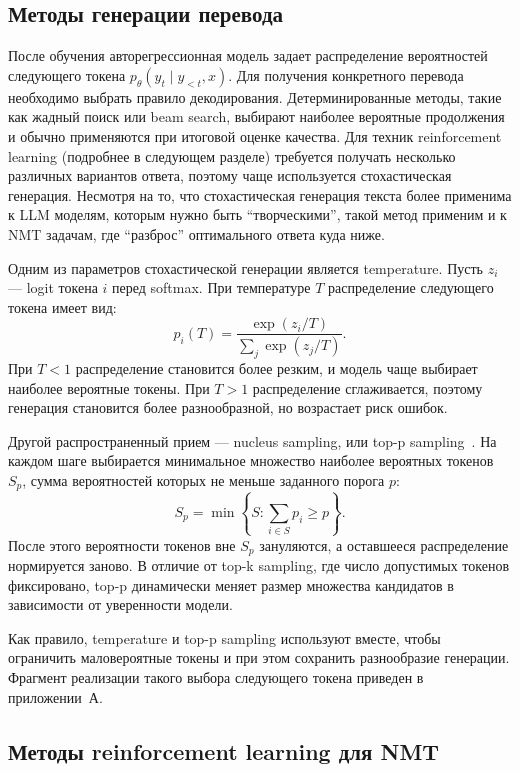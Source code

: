 \subsection{Методы генерации перевода}

После обучения авторегрессионная модель задает распределение вероятностей следующего токена $p_\theta(y_t \mid y_{<t}, x)$. Для получения конкретного перевода необходимо выбрать правило декодирования. Детерминированные методы, такие как жадный поиск или beam search, выбирают наиболее вероятные продолжения и обычно применяются при итоговой оценке качества.
Для техник reinforcement learning (подробнее в следующем разделе) требуется получать несколько различных вариантов ответа, поэтому чаще используется стохастическая генерация.
Несмотря на то, что стохастическая генерация текста более применима к LLM моделям, которым нужно быть ``творческими'', такой метод применим и к NMT задачам, где ``разброс'' оптимального ответа куда ниже.

Одним из параметров стохастической генерации является temperature. Пусть $z_i$ --- logit токена $i$ перед softmax. При температуре $T$ распределение следующего токена имеет вид:
\[
	p_i(T) = \frac{\exp(z_i / T)}{\sum_j \exp(z_j / T)}.
\]
При $T < 1$ распределение становится более резким, и модель чаще выбирает наиболее вероятные токены. При $T > 1$ распределение сглаживается, поэтому генерация становится более разнообразной, но возрастает риск ошибок.

Другой распространенный прием --- nucleus sampling, или top-p sampling~\cite{nucleus_sampling}. На каждом шаге выбирается минимальное множество наиболее вероятных токенов $S_p$, сумма вероятностей которых не меньше заданного порога $p$:
\[
	S_p = \min \left\{ S: \sum_{i \in S} p_i \geq p \right\}.
\]
После этого вероятности токенов вне $S_p$ зануляются, а оставшееся распределение нормируется заново. В отличие от top-k sampling, где число допустимых токенов фиксировано, top-p динамически меняет размер множества кандидатов в зависимости от уверенности модели.

Как правило, temperature и top-p sampling используют вместе, чтобы ограничить маловероятные токены и при этом сохранить разнообразие генерации. Фрагмент реализации такого выбора следующего токена приведен в приложении~А.

\subsection{Методы reinforcement learning для NMT}

